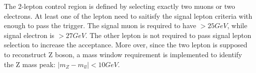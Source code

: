 \par The 2-lepton control region is defined by selecting exactly two muons or two electrons. At least one of the lepton need to saitisfy the signal lepton criteria with enough \pt to pass the trigger. The signal muon is required to have \pt $>25GeV$, while signal electron is \pt $>27GeV$. The other lepton is not required to pass signal lepton selection to increase the acceptance. More over, since the two lepton is supposed to reconstruct Z boson, a mass window requirement is implemented to identify the Z mass peak: $|m_{Z}-m_{ll}|<10GeV$.
